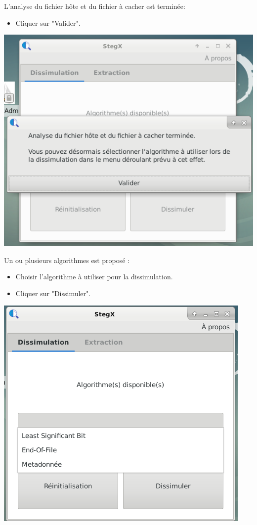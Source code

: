 \documentclass[11pt]{article}
\begin{document}
L'analyse du fichier hôte et du fichier à cacher est terminée: 
\begin{itemize}
\item Cliquer sur "Valider". 
\end{itemize}

\vspace{0.5cm}
\hspace{2cm}
\includegraphics[scale=0.8]{pictures/insertion_2.png}
\vspace{1cm}

Un ou plusieurs algorithmes est proposé : 
\begin{itemize}
\item Choisir l'algorithme à utiliser pour la dissimulation.
\item Cliquer sur "Dissimuler". 
\end{itemize}

\vspace{0.5cm}
\hspace{2cm}
\includegraphics[scale=0.8]{pictures/insertion_3.png}
\vspace{1cm}
\end{document}
